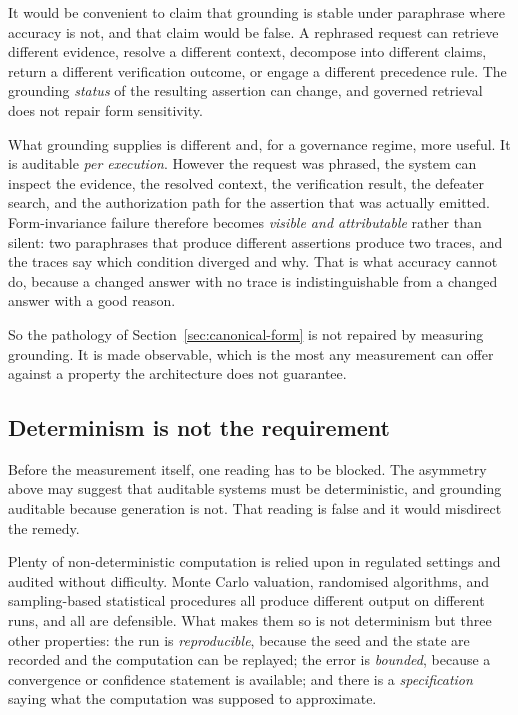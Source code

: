 It would be convenient to claim that grounding is stable under paraphrase where
accuracy is not, and that claim would be false. A rephrased request can retrieve
different evidence, resolve a different context, decompose into different claims, return a
different verification outcome, or engage a different precedence rule. The grounding
\emph{status} of the resulting assertion can change, and governed retrieval does not
repair form sensitivity.

What grounding supplies is different and, for a governance regime, more useful. It is
auditable \emph{per execution}. However the request was phrased, the system can inspect
the evidence, the resolved context, the verification result, the defeater search, and the
authorization path for the assertion that was actually emitted. Form-invariance failure
therefore becomes \emph{visible and attributable} rather than silent: two paraphrases that
produce different assertions produce two traces, and the traces say which condition
diverged and why. That is what accuracy cannot do, because a changed answer with no trace
is indistinguishable from a changed answer with a good reason.

So the pathology of Section~\ref{sec:canonical-form} is not repaired by measuring
grounding. It is made observable, which is the most any measurement can offer against a
property the architecture does not guarantee.

\subsection{Determinism is not the requirement}
\label{sec:determinism}

Before the measurement itself, one reading has to be blocked. The asymmetry above may
suggest that auditable systems must be deterministic, and grounding auditable because
generation is not. That reading is false and it would misdirect the remedy.

Plenty of non-deterministic computation is relied upon in regulated settings and
audited without difficulty. Monte Carlo valuation, randomised algorithms, and
sampling-based statistical procedures all produce different output on different
runs, and all are defensible. What makes them so is not determinism but three other
properties: the run is \emph{reproducible}, because the seed and the state are
recorded and the computation can be replayed; the error is \emph{bounded}, because a
convergence or confidence statement is available; and there is a
\emph{specification} saying what the computation was supposed to approximate.


